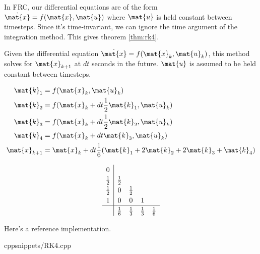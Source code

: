 In FRC, our differential equations are of the form
$\dot{\mat{x}} = f(\mat{x}, \mat{u})$ where $\mat{u}$ is held constant between
timesteps. Since it's time-invariant, we can ignore the time argument of the
integration method. This gives theorem \ref{thm:rk4}.
\begin{theorem}
  \label{thm:rk4}

  Given the differential equation $\dot{\mat{x}} = f(\mat{x}_k, \mat{u}_k)$,
  this method solves for $\mat{x}_{k+1}$ at $dt$ seconds in the future.
  $\mat{u}$ is assumed to be held constant between timesteps.
  \begin{center}
    \begin{minipage}{0.35\linewidth}
      \centering
      \begin{align*}
        \mat{k}_1 &= f(\mat{x}_k, \mat{u}_k) \\
        \mat{k}_2 &= f(\mat{x}_k + dt \frac{1}{2}\mat{k}_1, \mat{u}_k) \\
        \mat{k}_3 &= f(\mat{x}_k + dt \frac{1}{2}\mat{k}_2, \mat{u}_k) \\
        \mat{k}_4 &= f(\mat{x}_k + dt \mat{k}_3, \mat{u}_k) \\
        \mat{x}_{k+1} &= \mat{x}_k + dt \frac{1}{6} (\mat{k}_1 + 2\mat{k}_2 +
          2\mat{k}_3 + \mat{k}_4)
      \end{align*}
    \end{minipage}
    \quad
    \begin{minipage}{0.35\linewidth}
      \centering
      \begin{equation*}
        \renewcommand\arraystretch{1.2}
        \begin{array}{c|cccc}
          0 \\
          \frac{1}{2} & \frac{1}{2} \\
          \frac{1}{2} & 0 & \frac{1}{2} \\
          1 & 0 & 0 & 1 \\
          \hline
          & \frac{1}{6} & \frac{1}{3} & \frac{1}{3} & \frac{1}{6}
        \end{array}
      \end{equation*}
    \end{minipage}
  \end{center}
\end{theorem}

Here's a reference implementation.
\begin{coderemote}{cpp}{snippets/RK4.cpp}
  \caption{RK4 implementation in C++}
\end{coderemote}

